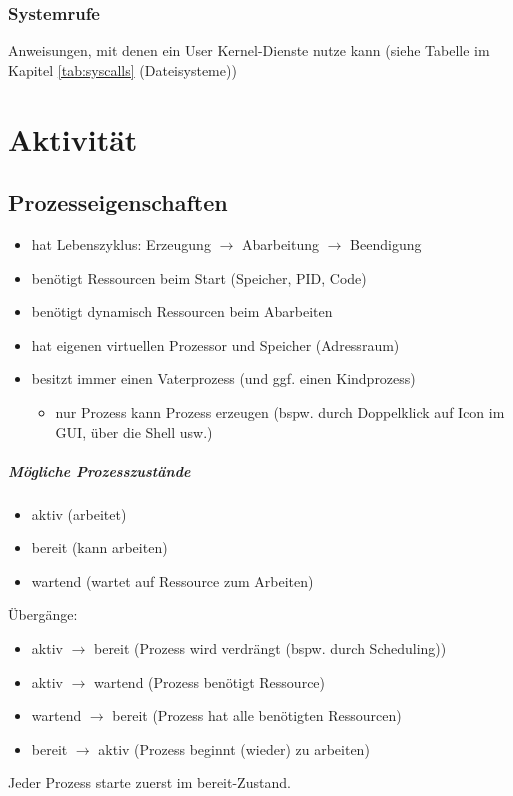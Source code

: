 \documentclass{scrreprt}
\renewcommand{\imptnt}[1]{#1}
\begin{document}
\subsection{Systemrufe}
Anweisungen, mit denen ein User Kernel-Dienste nutze kann (siehe Tabelle im Kapitel \ref{tab:syscalls} (Dateisysteme))

\chapter{Aktivität}
\section{Prozesseigenschaften}
\begin{itemize}
\item hat Lebenszyklus: Erzeugung $\to$ Abarbeitung $\to $ Beendigung
\item benötigt Ressourcen beim Start (Speicher, PID, Code)
\item benötigt dynamisch Ressourcen beim Abarbeiten
\item hat eigenen virtuellen Prozessor und Speicher (Adressraum)
\item besitzt immer einen Vaterprozess (und ggf. einen Kindprozess)
\begin{itemize}
\item \imptnt{nur Prozess kann Prozess erzeugen} (bspw. durch Doppelklick auf Icon im GUI, über die Shell usw.)
\end{itemize}
\end{itemize}
\paragraph{Mögliche Prozesszustände}
\begin{itemize}
\item \imptnt{aktiv} (arbeitet)
\item \imptnt{bereit} (kann arbeiten)
\item \imptnt{wartend} (wartet auf Ressource zum Arbeiten)
\end{itemize}
Übergänge:
\begin{itemize}
\item \imptnt{aktiv $\to$ bereit} (Prozess wird verdrängt (bspw. durch Scheduling))
\item \imptnt{aktiv $\to$ wartend} (Prozess benötigt Ressource)
\item \imptnt{wartend $\to$ bereit} (Prozess hat alle benötigten Ressourcen)
\item \imptnt{bereit $\to $ aktiv} (Prozess beginnt (wieder) zu arbeiten)
\end{itemize}
Jeder Prozess starte zuerst im bereit-Zustand.
\end{document}
